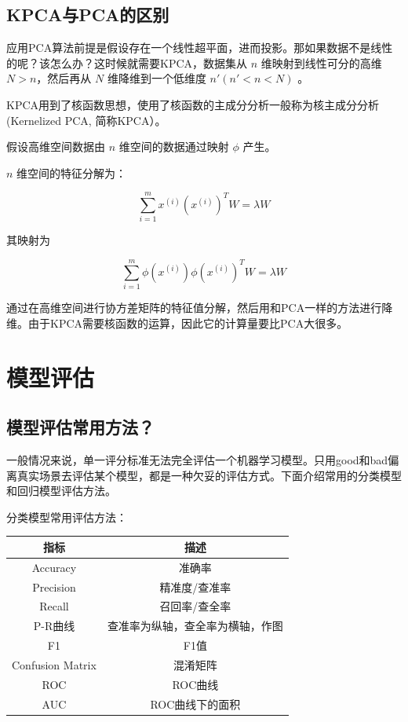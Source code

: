 \subsection{KPCA与PCA的区别}

应用PCA算法前提是假设存在一个线性超平面，进而投影。那如果数据不是线性的呢？该怎么办？这时候就需要KPCA，数据集从 $n$ 维映射到线性可分的高维 $N >n$，然后再从 $N$ 维降维到一个低维度 $n'(n'<n<N)$ 。

KPCA用到了核函数思想，使用了核函数的主成分分析一般称为核主成分分析(Kernelized PCA, 简称KPCA）。

假设高维空间数据由 $n$ 维空间的数据通过映射 $\phi$ 产生。

$n$ 维空间的特征分解为：

$$
\sum^m_{i=1} x^{(i)} \left( x^{(i)} \right)^T W = \lambda W
$$

其映射为

$$
\sum^m_{i=1} \phi \left( x^{(i)} \right) \phi \left( x^{(i)} \right)^T W = \lambda W
$$

通过在高维空间进行协方差矩阵的特征值分解，然后用和PCA一样的方法进行降维。由于KPCA需要核函数的运算，因此它的计算量要比PCA大很多。

\section{模型评估}

\subsection{模型评估常用方法？}

一般情况来说，单一评分标准无法完全评估一个机器学习模型。只用good和bad偏离真实场景去评估某个模型，都是一种欠妥的评估方式。下面介绍常用的分类模型和回归模型评估方法。

分类模型常用评估方法：

\begin{table}[h]
	\centering
	\begin{tabular}{|c|c|}\hline
		指标 & 描述 \\\hline
		Accuracy & 准确率 \\\hline
		Precision & 精准度/查准率 \\\hline
		Recall & 召回率/查全率 \\\hline
		P-R曲线 & 查准率为纵轴，查全率为横轴，作图 \\\hline
		F1 & F1值 \\\hline
		Confusion Matrix & 混淆矩阵 \\\hline
		ROC & ROC曲线 \\\hline
		AUC & ROC曲线下的面积 \\\hline
	\end{tabular}
\end{table}


